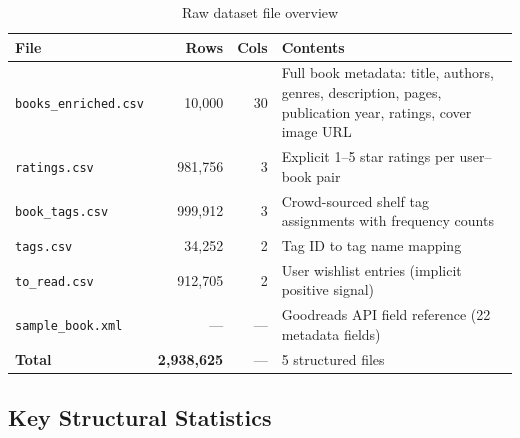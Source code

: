 \documentclass[12pt, a4paper]{article}
\newcommand{\code}[1]{\texttt{\small\color{shelfPurple}#1}}
\begin{document}
\begin{table}[H]
\centering
\caption{Raw dataset file overview}
\begin{tabularx}{\textwidth}{@{}lrrX@{}}
\toprule
\textbf{File} & \textbf{Rows} & \textbf{Cols} & \textbf{Contents} \\
\midrule
\code{books\_enriched.csv} & 10{,}000 & 30 &
  Full book metadata: title, authors, genres, description, pages,
  publication year, ratings, cover image URL \\[4pt]
\code{ratings.csv} & 981{,}756 & 3 &
  Explicit 1--5 star ratings per user--book pair \\[4pt]
\code{book\_tags.csv} & 999{,}912 & 3 &
  Crowd-sourced shelf tag assignments with frequency counts \\[4pt]
\code{tags.csv} & 34{,}252 & 2 &
  Tag ID to tag name mapping \\[4pt]
\code{to\_read.csv} & 912{,}705 & 2 &
  User wishlist entries (implicit positive signal) \\[4pt]
\code{sample\_book.xml} & --- & --- &
  Goodreads API field reference (22 metadata fields) \\
\midrule
\textbf{Total} & \textbf{2{,}938{,}625} & --- & 5 structured files \\
\bottomrule
\end{tabularx}
\end{table}

\subsection{Key Structural Statistics}
\end{document}
